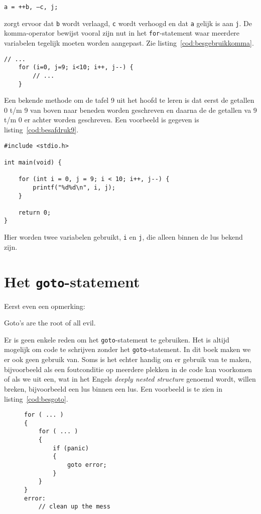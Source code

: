 \hspace*{1em}\texttt{a = ++b, --c, j;}

zorgt ervoor dat \texttt{b} wordt verlaagd, \texttt{c} wordt verhoogd en dat \texttt{a} gelijk is aan \texttt{j}. De komma-operator bewijst vooral zijn nut in het \texttt{for}-statement waar meerdere variabelen tegelijk moeten worden aangepast. Zie listing~\ref{cod:besgebruikkomma}.

\begin{lstlisting}[caption=Gebruik van de komma-operator.,label=cod:besgebruikkomma]
    // ...
    for (i=0, j=9; i<10; i++, j--) {
        // ...
    }
\end{lstlisting}

Een bekende methode om de tafel 9 uit het hoofd te leren is dat eerst de getallen 0 t/m 9 van boven naar beneden worden geschreven en daarna de de getallen va 9 t/m 0 er achter worden geschreven. Een voorbeeld is gegeven is listing~\ref{cod:besafdruk9}.


\begin{lstlisting}[caption=Afdrukken van de tafel van 9.,label=cod:besafdruk9]
#include <stdio.h>

int main(void) {

	for (int i = 0, j = 9; i < 10; i++, j--) {
		printf("%d%d\n", i, j);
	}

	return 0;
}
\end{lstlisting}

Hier worden twee variabelen gebruikt, \texttt{i} en \texttt{j}, die alleen binnen de lus bekend zijn.

\section{Het \texttt{goto}-statement}
Eerst even een opmerking:

\begin{displayquote}
Goto's are the root of all evil.
\end{displayquote}

Er is geen enkele reden om het \texttt{goto}-statement te gebruiken. Het is altijd mogelijk om code te schrijven zonder het \texttt{goto}-statement. In dit boek maken we er ook geen gebruik van. Soms is het echter handig om er gebruik van te maken, bijvoorbeeld als een foutconditie op meerdere plekken in de code kan voorkomen of als we uit een, wat in het Engels \textsl{deeply nested structure} genoemd wordt, willen breken, bijvoorbeeld een lus binnen een lus. Een voorbeeld is te zien in listing~\ref{cod:besgoto}.


\begin{figure}[!ht]
\begin{lstlisting}[caption=Gebruik van het \texttt{goto}-statement.,label=cod:besgoto]
for ( ... )
{
    for ( ... )
    {
        if (panic)
        {
            goto error;
        }
    }   
}
error:
    // clean up the mess
\end{lstlisting}
\end{figure}
